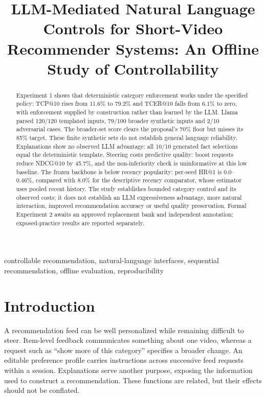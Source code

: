 \documentclass[conference]{IEEEtran}
\title{LLM-Mediated Natural Language Controls for Short-Video Recommender Systems: An Offline Study of Controllability}
\author{\IEEEauthorblockN{Vibhor Malik}\IEEEauthorblockA{M.Sc. in Applied Computing\\British Columbia Institute of Technology\\Supervisor: Borna Noureddin\\COMP 9500 research project\\Review draft: 14 October 2026, Vancouver time}}
\begin{document}
\maketitle
\thispagestyle{plain}
\pagestyle{plain}
\begin{abstract}
Experiment 1 shows that deterministic category enforcement works under the specified policy: TCP@10 rises from 11.6\% to 79.2\% and TCER@10 falls from 6.1\% to zero, with enforcement supplied by construction rather than learned by the LLM. Llama parsed 120/120 templated inputs, 79/100 broader synthetic inputs and 2/10 adversarial cases. The broader-set score clears the proposal's 70\% floor but misses its 85\% target. These finite synthetic sets do not establish general language reliability. Explanations show no observed LLM advantage: all 10/10 generated fact selections equal the deterministic template. Steering costs predictive quality: boost requests reduce NDCG@10 by 45.7\%, and the non-inferiority check is uninformative at this low baseline. The frozen backbone is below recency popularity: per-seed HR@1 is 0.0--0.46\%, compared with 8.0\% for the descriptive recency comparator, whose estimator uses pooled recent history. The study establishes bounded category control and its observed costs; it does not establish an LLM expressiveness advantage, more natural interaction, improved recommendation accuracy or useful quality preservation. Formal Experiment 2 awaits an approved replacement bank and independent annotation; exposed-practice results are reported separately.
\end{abstract}
\begin{IEEEkeywords}
controllable recommendation, natural-language interfaces, sequential recommendation, offline evaluation, reproducibility
\end{IEEEkeywords}

\section{Introduction}
A recommendation feed can be well personalized while remaining difficult to steer. Item-level feedback communicates something about one video, whereas a request such as ``show more of this category'' specifies a broader change. An editable preference profile carries instructions across successive feed requests within a session. Explanations serve another purpose, exposing the information used to construct a recommendation. These functions are related, but their effects should not be conflated.
\end{document}
